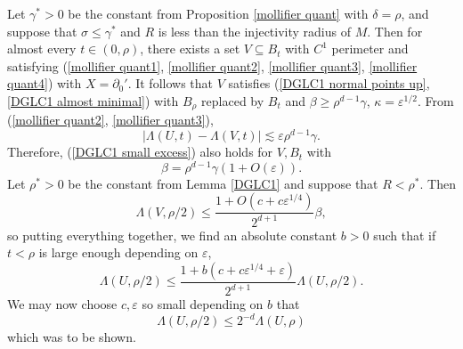 Let $\gamma^* > 0$ be the constant from Proposition \ref{mollifier quant} with $\delta = \rho$, and suppose that $\sigma \leq \gamma^*$ and $R$ is less than the injectivity radius of $M$.
Then for almost every $t \in (0, \rho)$, there exists a set $V \subseteq B_t$ with $C^1$ perimeter and satisfying (\ref{mollifier quant1}, \ref{mollifier quant2}, \ref{mollifier quant3}, \ref{mollifier quant4}) with $X = \partial_0'$.
It follows that $V$ satisfies (\ref{DGLC1 normal points up}, \ref{DGLC1 almost minimal}) with $B_\rho$ replaced by $B_t$ and $\beta \geq \rho^{d - 1} \gamma$, $\kappa = \varepsilon^{1/2}$.
From (\ref{mollifier quant2}, \ref{mollifier quant3}),
$$|\Lambda(U, t) - \Lambda(V, t)| \lesssim \varepsilon \rho^{d - 1} \gamma.$$
Therefore, (\ref{DGLC1 small excess}) also holds for $V, B_t$ with
$$\beta = \rho^{d - 1} \gamma(1 + O(\varepsilon)).$$
Let $\rho^* > 0$ be the constant from Lemma \ref{DGLC1} and suppose that $R < \rho^*$.
Then
$$\Lambda(V, \rho/2) \leq \frac{1 + O(c + c\varepsilon^{1/4})}{2^{d + 1}} \beta,$$
so putting everything together, we find an absolute constant $b > 0$ such that if $t < \rho$ is large enough depending on $\varepsilon$,
$$\Lambda(U, \rho/2) \leq \frac{1 + b(c + c\varepsilon^{1/4} + \varepsilon)}{2^{d + 1}} \Lambda(U, \rho/2).$$
We may now choose $c, \varepsilon$ so small depending on $b$ that 
$$\Lambda(U, \rho/2) \leq 2^{-d} \Lambda(U, \rho)$$
which was to be shown.